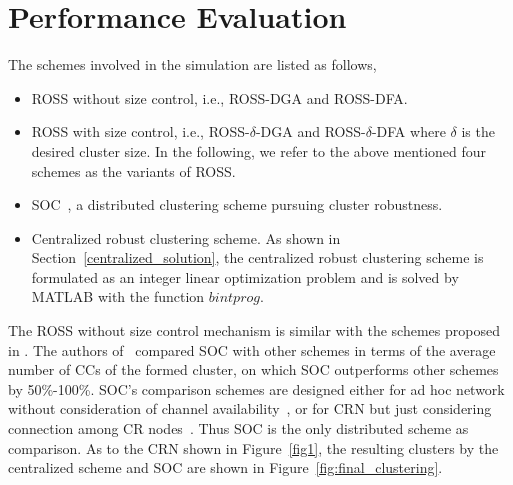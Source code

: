\documentclass[10pt,journal,compsoc]{IEEEtran}
\theoremstyle{mytheoremstyle}
\theoremstyle{mytheoremstyle}
\theoremstyle{mytheoremstyle}
\newcommand{\ie}{i.e., }
\begin{document}
\section{Performance Evaluation}
\label{performance}
The schemes involved in the simulation are listed as follows,
\begin{itemize}
\item ROSS without size control, \ie ROSS-DGA and ROSS-DFA.
\item ROSS with size control, \ie ROSS-$\delta$-DGA and ROSS-$\delta$-DFA where $\delta$ is the desired cluster size.
In the following, we refer to the above mentioned four schemes as the variants of ROSS.
\item SOC~\cite{LIU_TMC11_2}, a distributed clustering scheme pursuing cluster robustness.
\item Centralized robust clustering scheme. 
As shown in Section~\ref{centralized_solution}, the centralized robust clustering scheme is formulated as an integer linear optimization problem and is solved by MATLAB with the function $bintprog$.
\end{itemize}

The ROSS without size control mechanism is similar with the schemes proposed in \cite{Li11_ROSS}.
The authors of~\cite{LIU_TMC11_2} compared SOC with other schemes in terms of the average number of CCs of the formed cluster, on which SOC outperforms other schemes by 50\%-100\%. 
SOC's comparison schemes are designed either for ad hoc network without consideration of channel availability~\cite{Basagni99}, or for CRN but just considering connection among CR nodes~\cite{Zhao07}. 
Thus SOC is the only distributed scheme as comparison.
As to the CRN shown in Figure~\ref{fig1}, the resulting clusters by the centralized scheme and SOC are shown in Figure~\ref{fig:final_clustering}.
\end{document}
